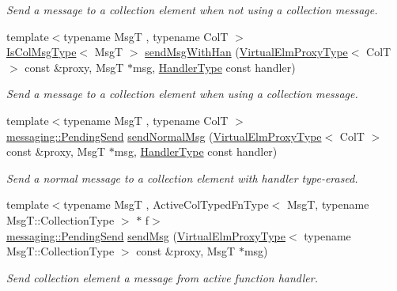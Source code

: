 \begin{DoxyCompactItemize}
\begin{DoxyCompactList}\small\item\em Send a message to a collection element when not using a collection message. \end{DoxyCompactList}\item 
{\footnotesize template$<$typename MsgT , typename ColT $>$ }\\\hyperlink{structvt_1_1vrt_1_1collection_1_1_collection_manager_a21c21612c806016788057aeab142af20}{Is\+Col\+Msg\+Type}$<$ MsgT $>$ \hyperlink{structvt_1_1vrt_1_1collection_1_1_collection_manager_a6b95df3e94665b5ec8a2c1a186f4ca30}{send\+Msg\+With\+Han} (\hyperlink{namespacevt_1_1vrt_a620a5c8c59d13e513f690c74b4af516f}{Virtual\+Elm\+Proxy\+Type}$<$ ColT $>$ const \&proxy, MsgT $\ast$msg, \hyperlink{namespacevt_af64846b57dfcaf104da3ef6967917573}{Handler\+Type} const handler)
\begin{DoxyCompactList}\small\item\em Send a message to a collection element when using a collection message. \end{DoxyCompactList}\item 
{\footnotesize template$<$typename MsgT , typename ColT $>$ }\\\hyperlink{structvt_1_1messaging_1_1_pending_send}{messaging\+::\+Pending\+Send} \hyperlink{structvt_1_1vrt_1_1collection_1_1_collection_manager_a706ce2445fae153c075d3c20f2063507}{send\+Normal\+Msg} (\hyperlink{namespacevt_1_1vrt_a620a5c8c59d13e513f690c74b4af516f}{Virtual\+Elm\+Proxy\+Type}$<$ ColT $>$ const \&proxy, MsgT $\ast$msg, \hyperlink{namespacevt_af64846b57dfcaf104da3ef6967917573}{Handler\+Type} const handler)
\begin{DoxyCompactList}\small\item\em Send a normal message to a collection element with handler type-\/erased. \end{DoxyCompactList}\item 
{\footnotesize template$<$typename MsgT , Active\+Col\+Typed\+Fn\+Type$<$ Msg\+T, typename Msg\+T\+::\+Collection\+Type $>$ $\ast$ f$>$ }\\\hyperlink{structvt_1_1messaging_1_1_pending_send}{messaging\+::\+Pending\+Send} \hyperlink{structvt_1_1vrt_1_1collection_1_1_collection_manager_a3165b258fab15c35985b3f9b8ef0dbe7}{send\+Msg} (\hyperlink{namespacevt_1_1vrt_a620a5c8c59d13e513f690c74b4af516f}{Virtual\+Elm\+Proxy\+Type}$<$ typename Msg\+T\+::\+Collection\+Type $>$ const \&proxy, MsgT $\ast$msg)
\begin{DoxyCompactList}\small\item\em Send collection element a message from active function handler. \end{DoxyCompactList}\item 

\end{DoxyCompactItemize}
